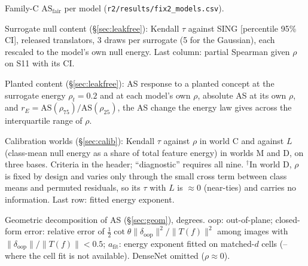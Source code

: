 \documentclass[10pt]{article}
\newcommand{\ASF}{\mathrm{AS}_{\mathrm{fair}}}
\begin{document}
\begin{table}[H]
\centering\footnotesize
\resizebox{\linewidth}{!}{}
\caption{Family-C $\ASF$ per model (\texttt{r2/results/fix2\_models.csv}).}
\label{tab:famc}
\end{table}

\begin{table}[H]
\centering\footnotesize
\resizebox{\linewidth}{!}{}
\caption{Surrogate null content (\S\ref{sec:leakfree}): Kendall $\tau$ against SING [percentile 95\% CI], released translators, 3 draws per surrogate (5 for the Gaussian), each rescaled to the model's own null energy. Last column: partial Spearman given $\rho$ on S11 with its CI.}
\label{tab:surr}
\end{table}

\begin{table}[H]
\centering\footnotesize
\resizebox{\linewidth}{!}{}
\caption{Planted content (\S\ref{sec:leakfree}): AS response to a planted concept at the surrogate energy $\rho_t{=}0.2$ and at each model's own $\rho$, absolute AS at its own $\rho$, and $r_E=\mathrm{AS}(\rho_{75})/\mathrm{AS}(\rho_{25})$, the AS change the energy law gives across the interquartile range of $\rho$.}
\label{tab:planted}
\end{table}

\begin{table}[H]
\centering\footnotesize
\resizebox{\linewidth}{!}{}
\caption{Calibration worlds (\S\ref{sec:calib}): Kendall $\tau$ against $\rho$ in world C and against $L$ (class-mean null energy as a share of total feature energy) in worlds M and D, on three bases. Criteria in the header; ``diagnostic'' requires all nine. $^{\dagger}$In world D, $\rho$ is fixed by design and varies only through the small cross term between class means and permuted residuals, so its $\tau$ with $L$ is $\approx0$ (near-ties) and carries no information. Last row: fitted energy exponent.}
\label{tab:calib}
\end{table}

\begin{table}[H]
\centering\footnotesize
\resizebox{\linewidth}{!}{}
\caption{Geometric decomposition of AS (\S\ref{sec:geom}), degrees. oop: out-of-plane; closed-form error: relative error of $\tfrac12\cot\theta\|\delta_{\mathrm{oop}}\|^2/\|T(f)\|^2$ among images with $\|\delta_{\mathrm{oop}}\|/\|T(f)\|<0.5$; $a_{\mathrm{fit}}$: energy exponent fitted on matched-$d$ cells (-- where the cell fit is not available). DenseNet omitted ($\rho\approx0$).}
\label{tab:geom}
\end{table}
\end{document}
